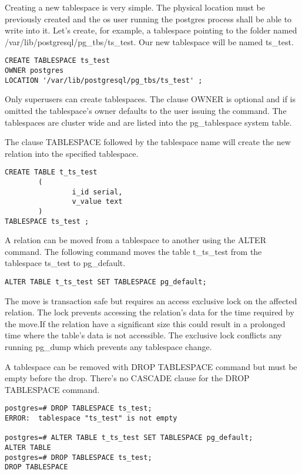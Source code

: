 Creating a new tablespace is very simple. The physical location must be previously created and the os
user running the postgres process shall be able to write into it. Let's create, for example, a tablespace
pointing to the folder named /var/lib/postgresql/pg\_tbs/ts\_test. Our new tablespace will be named
ts\_test.

\begin{lstlisting}[style=pgsql]
CREATE TABLESPACE ts_test
OWNER postgres
LOCATION '/var/lib/postgresql/pg_tbs/ts_test' ;

\end{lstlisting}

Only superusers can create tablespaces. The clause OWNER is optional and if  is omitted the tablespace's
owner defaults to the user issuing the command. The tablespaces are cluster wide and are listed into the
pg\_tablespace system table.\newline

The clause TABLESPACE followed by the tablespace name will create the new relation into the specified
tablespace.

\begin{lstlisting}[style=pgsql]
CREATE TABLE t_ts_test
        (
                i_id serial,
                v_value text
        )
TABLESPACE ts_test ;

\end{lstlisting}

A relation can be moved from a tablespace to another using the ALTER command. The following command
moves the table t\_ts\_test from the tablespace ts\_test to pg\_default.

\begin{lstlisting}[style=pgsql]
ALTER TABLE t_ts_test SET TABLESPACE pg_default;
\end{lstlisting}

The move is transaction safe but requires an access exclusive lock on the affected relation. The lock
prevents accessing the relation's data for the time required by the move.If the relation have a
significant size this could result in a prolonged time where the table's data is not accessible.
The exclusive lock conflicts any running pg\_dump which prevents any tablespace change.\newline


A tablespace can be removed with DROP TABLESPACE command but must be empty before the drop. There's no
CASCADE clause for the DROP TABLESPACE command.

\begin{lstlisting}[style=pgsql]
postgres=# DROP TABLESPACE ts_test;
ERROR:  tablespace "ts_test" is not empty

postgres=# ALTER TABLE t_ts_test SET TABLESPACE pg_default;
ALTER TABLE
postgres=# DROP TABLESPACE ts_test;
DROP TABLESPACE

\end{lstlisting}


